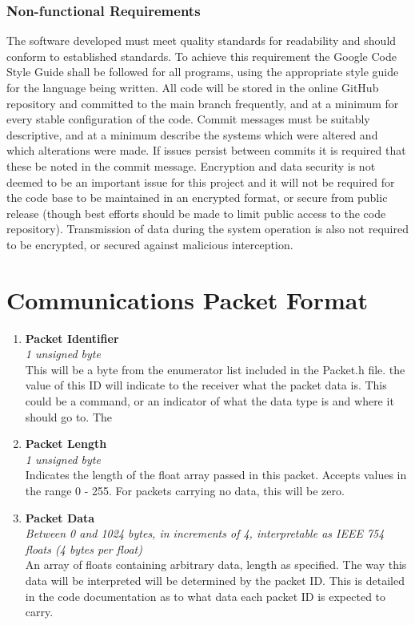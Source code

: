 \documentclass[main.tex]{subfiles}
\begin{document}
\begin{appendices}
\subsection{Non-functional Requirements}
The software developed must meet quality standards for readability and should conform to established standards. To achieve this requirement the Google Code Style Guide shall be followed for all programs, using the appropriate style guide for the language being written. All code will be stored in the online GitHub repository and committed to the main branch frequently, and at a minimum for every stable configuration of the code. Commit messages must be suitably descriptive, and at a minimum describe the systems which were altered and which alterations were made. If issues persist between commits it is required that these be noted in the commit message. 
Encryption and data security is not deemed to be an important issue for this project and it will not be required for the code base to be maintained in an encrypted format, or secure from public release (though best efforts should be made to limit public access to the code repository). Transmission of data during the system operation is also not required to be encrypted, or secured against malicious interception. 




\chapter{Communications Packet Format}

\begin{enumerate}
\item 
\textbf{Packet Identifier}\\
\textit{1 unsigned byte} \\
This will be a byte from the enumerator list included in the Packet.h file.
the value of this ID will indicate to the receiver what the packet data is. This could be a command, or an indicator of what the data type is and where it should go to. The 
\item
\textbf{Packet Length}\\
\textit{1 unsigned byte}\\
Indicates the length of the float array
				passed in this packet. Accepts values in the range 0 - 255. For packets carrying no data, this will be zero.
\item
\textbf{Packet Data}\\
\textit{Between 0 and 1024 bytes, in increments of 4, interpretable as IEEE 754 floats (4 bytes per float)}\\
An array of floats containing arbitrary data, length as specified. The way this data will be interpreted will be determined by the packet ID. This is detailed in the code documentation as to what data each packet ID is expected to carry. 
\end{enumerate}


\end{appendices}
\end{document}
